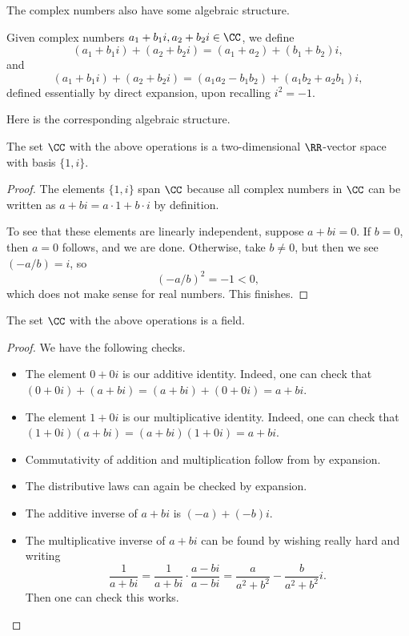 The complex numbers also have some algebraic structure.
\begin{definition}
	Given complex numbers $a_1+b_1i,a_2+b_2i\in\CC$, we define
	\[(a_1+b_1i)+(a_2+b_2i)=(a_1+a_2)+(b_1+b_2)i,\]
	and
	\[(a_1+b_1i)+(a_2+b_2i)=(a_1a_2-b_1b_2)+(a_1b_2+a_2b_1)i,\]
	defined essentially by direct expansion, upon recalling $i^2=-1$.
\end{definition}
Here is the corresponding algebraic structure.
\begin{proposition}
	The set $\CC$ with the above operations is a two-dimensional $\RR$-vector space with basis $\{1,i\}$.
\end{proposition}
\begin{proof}
	The elements $\{1,i\}$ span $\CC$ because all complex numbers in $\CC$ can be written as $a+bi=a\cdot1+b\cdot i$ by definition.
	
	To see that these elements are linearly independent, suppose $a+bi=0$. If $b=0$, then $a=0$ follows, and we are done. Otherwise, take $b\ne0$, but then we see $(-a/b)=i$, so
	\[(-a/b)^2=-1<0,\]
	which does not make sense for real numbers. This finishes.
\end{proof}
\begin{proposition}
	The set $\CC$ with the above operations is a field.
\end{proposition}
\begin{proof}
	We have the following checks.
	\begin{itemize}
		\item The element $0+0i$ is our additive identity. Indeed, one can check that $(0+0i)+(a+bi)=(a+bi)+(0+0i)=a+bi$.
		\item The element $1+0i$ is our multiplicative identity. Indeed, one can check that $(1+0i)(a+bi)=(a+bi)(1+0i)=a+bi$.
		\item Commutativity of addition and multiplication follow from by expansion.
		\item The distributive laws can again be checked by expansion.
		\item The additive inverse of $a+bi$ is $(-a)+(-b)i$.
		\item The multiplicative inverse of $a+bi$ can be found by wishing really hard and writing
		\[\frac1{a+bi}=\frac1{a+bi}\cdot\frac{a-bi}{a-bi}=\frac a{a^2+b^2}-\frac b{a^2+b^2}i.\]
		Then one can check this works.
		\qedhere
	\end{itemize}
\end{proof}
